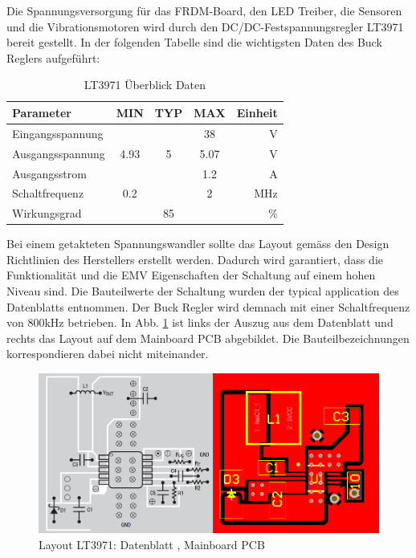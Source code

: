 Die Spannungsversorgung für das FRDM-Board, den LED Treiber, die Sensoren und die Vibrationsmotoren wird durch den DC/DC-Festspannungsregler LT3971 bereit gestellt. In der folgenden Tabelle sind die wichtigsten Daten des Buck Reglers aufgeführt:

\begin{table}[H]
	\small
	\centering
	\caption{LT3971 Überblick Daten \protect\cite{LT3971_Datasheet}}
	\begin{tabular}{|l|ccc|r|}
		\hline
		\textbf{Parameter} & \multicolumn{1}{l}{\textbf{MIN}} & \multicolumn{1}{l}{\textbf{TYP}} & \multicolumn{1}{l}{\textbf{MAX}} & \textbf{Einheit} \\
		\hline
		Eingangsspannung &       &       & 38    & V \\
		\hline
		Ausgangsspannung & 4.93  & 5     & 5.07  & V \\
		\hline
		Ausgangsstrom &       &       & 1.2   & A \\
		\hline
		Schaltfrequenz & 0.2   &       & 2     & MHz \\
		\hline
		Wirkungsgrad &       & 85    &       & \% \\
		\hline
	\end{tabular}%
	\label{tab:LT3971_Datasheet}%
\end{table}%

Bei einem getakteten Spannungswandler sollte das Layout gemäss den Design Richtlinien des Herstellers erstellt werden. Dadurch wird garantiert, dass die Funktionalität und die EMV Eigenschaften der Schaltung auf einem hohen Niveau sind. Die Bauteilwerte der Schaltung wurden der typical application des Datenblatts entnommen. Der Buck Regler wird demnach mit einer Schaltfrequenz von 800kHz betrieben. In Abb. \ref{fig:LT2971_Layout} ist links der Auszug aus dem Datenblatt und rechts das Layout auf dem Mainboard PCB abgebildet. Die Bauteilbezeichnungen korrespondieren dabei nicht miteinander.

\begin{figure}[H]
	\includegraphics[draft=false,width=1\textwidth]{Illustrationen/6-Umsetzung/LT3971_Layout.png}
	\caption{Layout LT3971: Datenblatt \protect\cite{LT3971_Datasheet}, Mainboard PCB}
	\label{fig:LT2971_Layout}
\end{figure}

